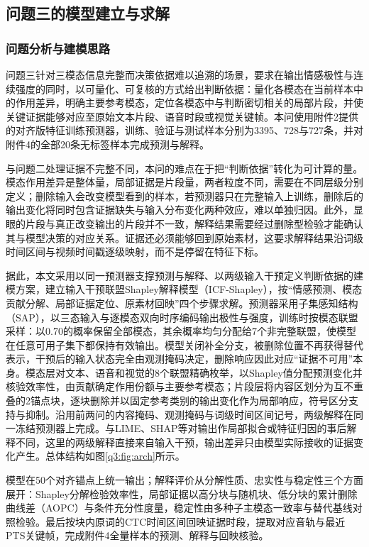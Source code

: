 \FloatBarrier

\subsection{问题三的模型建立与求解}
\label{sec:q3}
\FloatBarrier
\subsubsection{问题分析与建模思路}
问题三针对三模态信息完整而决策依据难以追溯的场景，要求在输出情感极性与连续强度的同时，以可量化、可复核的方式给出判断依据：量化各模态在当前样本中的作用差异，明确主要参考模态，定位各模态中与判断密切相关的局部片段，并使关键证据能够对应至原始文本片段、语音时段或视觉关键帧。本问使用附件2提供的对齐版特征训练预测器，训练、验证与测试样本分别为3395、728与727条，并对附件4的全部20条无标签样本完成预测与解释。

与问题二处理证据不完整不同，本问的难点在于把“判断依据”转化为可计算的量。模态作用差异是整体量，局部证据是片段量，两者粒度不同，需要在不同层级分别定义；删除输入会改变模型看到的样本，若预测器只在完整输入上训练，删除后的输出变化将同时包含证据缺失与输入分布变化两种效应，难以单独归因。此外，显眼的片段与真正改变输出的片段并不一致，解释结果需要经过删除型检验才能确认其与模型决策的对应关系。证据还必须能够回到原始素材，这要求解释结果沿词级时间区间与视频时间戳逐级映射，而不是停留在特征下标。

据此，本文采用以同一预测器支撑预测与解释、以两级输入干预定义判断依据的建模方案，建立输入干预联盟Shapley解释模型（ICF-Shapley）\cite{ref:shapley}，按“情感预测、模态贡献分解、局部证据定位、原素材回映”四个步骤求解。预测器采用子集感知结构（SAP），以三态输入与逐模态双向时序编码输出极性与强度，训练时按模态联盟采样：以0.70的概率保留全部模态，其余概率均匀分配给7个非完整联盟，使模型在任意可用子集下都保持有效输出。模型关闭补全分支，被删除位置不再获得替代表示，干预后的输入状态完全由观测掩码决定，删除响应因此对应“证据不可用”本身。模态层对文本、语音和视觉的8个联盟精确枚举，以Shapley值分配预测变化并核验效率性，由贡献确定作用份额与主要参考模态；片段层将内容区划分为互不重叠的2锚点块，逐块删除并以固定参考类别的输出变化作为局部响应，符号区分支持与抑制。沿用前两问的内容掩码、观测掩码与词级时间区间记号，两级解释在同一冻结预测器上完成。与LIME\cite{ref:lime}、SHAP\cite{ref:shap}等对输出作局部拟合或特征归因的事后解释不同，这里的两级解释直接来自输入干预，输出差异只由模型实际接收的证据变化产生。总体结构如图\ref{q3:fig:arch}所示。

模型在50个对齐锚点上统一输出；解释评价从分解性质、忠实性与稳定性三个方面展开：Shapley分解检验效率性，局部证据以高分块与随机块、低分块的累计删除曲线差（AOPC）与条件充分性度量，稳定性由多种子主模态一致率与替代基线对照检验。最后按块内原词的CTC时间区间回映证据时段，提取对应音轨与最近PTS关键帧，完成附件4全量样本的预测、解释与回映核验。

